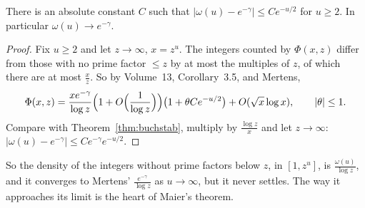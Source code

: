 \begin{corollary}\label{cor:buchstablimit}
There is an absolute constant $C$ such that $|\omega(u)-e^{-\gamma}|\le Ce^{-u/2}$ for $u\ge2$. In particular $\omega(u)\to e^{-\gamma}$.
\end{corollary}
\begin{proof}
Fix $u\ge2$ and let $z\to\infty$, $x=z^u$. The integers counted by $\Phi(x,z)$ differ from those with no prime factor $\le z$ by at most the multiples of $z$, of which there are at most $\frac xz$. So by Volume~13, Corollary~3.5, and Mertens,
\[
\Phi(x,z)=\frac{xe^{-\gamma}}{\log z}\Bigl(1+O\Bigl(\frac1{\log z}\Bigr)\Bigr)\bigl(1+\theta Ce^{-u/2}\bigr)+O(\sqrt x\log x),\qquad|\theta|\le1.
\]
Compare with Theorem~\ref{thm:buchstab}, multiply by $\frac{\log z}x$ and let $z\to\infty$: $|\omega(u)-e^{-\gamma}|\le Ce^{-\gamma}e^{-u/2}$.
\end{proof}

So the density of the integers without prime factors below $z$, in $[1,z^u]$, is $\frac{\omega(u)}{\log z}$, and it converges to Mertens' $\frac{e^{-\gamma}}{\log z}$ as $u\to\infty$, but it never settles. The way it approaches its limit is the heart of Maier's theorem.

